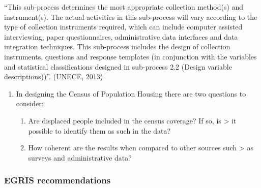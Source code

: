 \documentclass[
]{article}
\begin{document}
``This sub-process determines the most appropriate collection method(s)
and instrument(s). The actual activities in this sub-process will vary
according to the type of collection instruments required, which can
include computer assisted interviewing, paper questionnaires,
administrative data interfaces and data integration techniques. This
sub-process includes the design of collection instruments, questions and
response templates (in conjunction with the variables and statistical
classifications designed in sub-process 2.2 (Design variable
descriptions))''. (UNECE, 2013)

\begin{enumerate}
\def\labelenumi{\arabic{enumi}.}
\setcounter{enumi}{87}
\item
  In designing the Census of Population Housing there are two
  questions to consider:

  \begin{enumerate}
  \def\labelenumii{\arabic{enumii}.}
  \setcounter{enumii}{8}
  \item
    Are displaced people included in the census coverage? If so, is
    \textgreater{} it possible to identify them as such in the data?
  \item
    How coherent are the results when compared to other sources such
    \textgreater{} as surveys and administrative data?
  \end{enumerate}
\end{enumerate}

\hypertarget{a.1.-egris-recommendations}{%
\subsubsection{EGRIS recommendations}\label{a.1.-egris-recommendations}}
\end{document}
